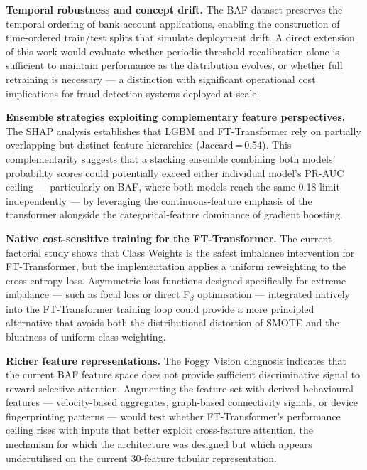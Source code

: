 \textbf{Temporal robustness and concept drift.} The BAF dataset preserves the temporal ordering of bank account applications, enabling the construction of time-ordered train/test splits that simulate deployment drift. A direct extension of this work would evaluate whether periodic threshold recalibration alone is sufficient to maintain performance as the distribution evolves, or whether full retraining is necessary — a distinction with significant operational cost implications for fraud detection systems deployed at scale.

\textbf{Ensemble strategies exploiting complementary feature perspectives.} The SHAP analysis establishes that LGBM and FT-Transformer rely on partially overlapping but distinct feature hierarchies (Jaccard\,=\,0.54). This complementarity suggests that a stacking ensemble combining both models' probability scores could potentially exceed either individual model's PR-AUC ceiling — particularly on BAF, where both models reach the same 0.18 limit independently — by leveraging the continuous-feature emphasis of the transformer alongside the categorical-feature dominance of gradient boosting.

\textbf{Native cost-sensitive training for the FT-Transformer.} The current factorial study shows that Class Weights is the safest imbalance intervention for FT-Transformer, but the implementation applies a uniform reweighting to the cross-entropy loss. Asymmetric loss functions designed specifically for extreme imbalance — such as focal loss or direct F$_\beta$ optimisation — integrated natively into the FT-Transformer training loop could provide a more principled alternative that avoids both the distributional distortion of SMOTE and the bluntness of uniform class weighting.

\textbf{Richer feature representations.} The Foggy Vision diagnosis indicates that the current BAF feature space does not provide sufficient discriminative signal to reward selective attention. Augmenting the feature set with derived behavioural features — velocity-based aggregates, graph-based connectivity signals, or device fingerprinting patterns — would test whether FT-Transformer's performance ceiling rises with inputs that better exploit cross-feature attention, the mechanism for which the architecture was designed but which appears underutilised on the current 30-feature tabular representation.
